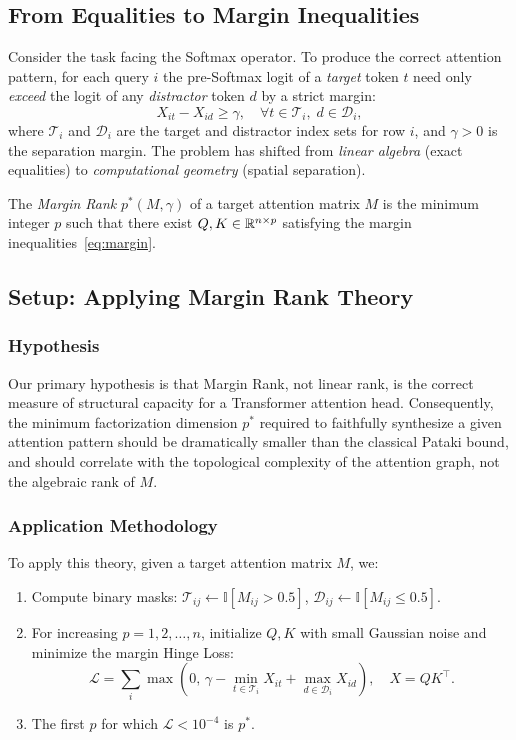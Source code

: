 \subsection{From Equalities to Margin Inequalities}

Consider the task facing the Softmax operator. To produce the correct attention pattern, for
each query $i$ the pre-Softmax logit of a \emph{target} token $t$ need only \emph{exceed}
the logit of any \emph{distractor} token $d$ by a strict margin:
\begin{equation}
  X_{it} - X_{id} \geq \gamma, \quad \forall t \in \mathcal{T}_i,\; d \in \mathcal{D}_i,
  \label{eq:margin}
\end{equation}
where $\mathcal{T}_i$ and $\mathcal{D}_i$ are the target and distractor index sets for
row $i$, and $\gamma > 0$ is the separation margin. The problem has shifted from
\emph{linear algebra} (exact equalities) to \emph{computational geometry} (spatial
separation).

\begin{definition}
  The \emph{Margin Rank} $p^*(M, \gamma)$ of a target attention matrix $M$ is the minimum
  integer $p$ such that there exist $Q, K \in \mathbb{R}^{n \times p}$ satisfying the margin
  inequalities~\eqref{eq:margin}.
\end{definition}

\subsection{Setup: Applying Margin Rank Theory}

\subsubsection{Hypothesis}
Our primary hypothesis is that Margin Rank, not linear rank, is the correct measure of structural
capacity for a Transformer attention head. Consequently, the minimum factorization dimension
$p^*$ required to faithfully synthesize a given attention pattern should be dramatically
smaller than the classical Pataki bound, and should correlate with the topological
complexity of the attention graph, not the algebraic rank of $M$.

\subsubsection{Application Methodology}
To apply this theory, given a target attention matrix $M$, we:
\begin{enumerate}
  \item Compute binary masks: $\mathcal{T}_{ij} \leftarrow \mathbb{I}[M_{ij} > 0.5]$,
        $\mathcal{D}_{ij} \leftarrow \mathbb{I}[M_{ij} \leq 0.5]$.
  \item For increasing $p = 1, 2, \ldots, n$, initialize $Q, K$ with small Gaussian noise
        and minimize the margin Hinge Loss:
        \[
          \mathcal{L} = \sum_i \max\!\left(0,\, \gamma - \min_{t \in \mathcal{T}_i} X_{it}
          + \max_{d \in \mathcal{D}_i} X_{id}\right), \quad X = QK^\top.
        \]
  \item The first $p$ for which $\mathcal{L} < 10^{-4}$ is $p^*$.
\end{enumerate}

